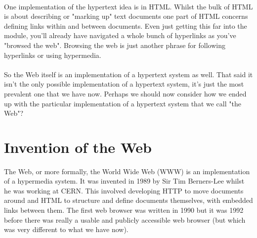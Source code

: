 \paragraph{} One implementation of the hypertext idea is in HTML.  Whilst the bulk of HTML is about describing or "marking up" text documents one part of HTML concerns defining links within and between documents. Even just getting this far into the module, you'll already have navigated a whole bunch of hyperlinks as you've "browsed the web". Browsing the web is just another phrase for following hyperlinks or using hypermedia. 
\paragraph{} So the Web itself is an implementation of a hypertext system as well. That said it isn't the only possible implementation of a hypertext system, it's just the most prevalent one that we have now. Perhaps we should now consider how we ended up with the particular implementation of a hypertext system that we call "the Web"?


\section{Invention of the Web}
\paragraph{} The Web, or more formally, the World Wide Web (WWW) is an implementation of a hypermedia system. It was invented in 1989 by Sir Tim Berners-Lee whilst he was working at CERN. This involved developing HTTP to move documents around and HTML to structure and define documents themselves, with embedded links between them. The first web browser was written in 1990 but it was 1992 before there was really a usable and publicly accessible web browser (but which was very different to what we have now).

